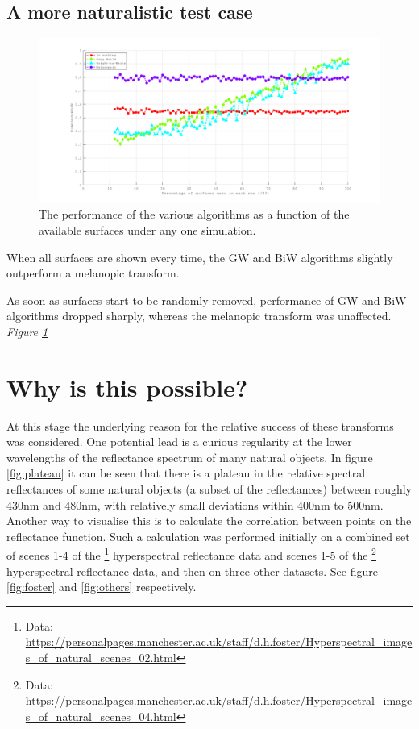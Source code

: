 
\subsection{A more naturalistic test case}

\begin{figure}[htbp]
 \includegraphics[max width=\textwidth]{figs/comp/melcomp_9/4a_summary.png}
 \caption{The performance of the various algorithms as a function of the available surfaces under any one simulation.}
 \label{fig:4asum}
\end{figure} 

When all surfaces are shown every time, the \gls{GW} and \gls{BiW} algorithms slightly outperform a melanopic transform.


As soon as surfaces start to be randomly removed, performance of \gls{GW} and \gls{BiW} algorithms dropped sharply, whereas the melanopic transform was unaffected. \emph{Figure \ref{fig:4asum}}


\section{Why is this possible?}


At this stage the underlying reason for the relative success of these transforms was considered. One potential lead is a curious regularity at the lower wavelengths of the reflectance spectrum of many natural objects. In figure \ref{fig:plateau} it can be seen that there is a plateau in the relative spectral reflectances of some natural objects (a subset of the \citet{vrhel_measurement_1994} reflectances) between roughly 430nm and 480nm, with relatively small deviations within 400nm to 500nm. Another way to visualise this is to calculate the correlation between points on the reflectance function. Such a calculation was performed initially on a combined set of scenes 1-4 of the
\citet{nascimento_statistics_2002}\footnote{Data: \url{https://personalpages.manchester.ac.uk/staff/d.h.foster/Hyperspectral_images_of_natural_scenes_02.html}} hyperspectral reflectance data and
scenes 1-5 of the 
\citet{foster_frequency_2006}\footnote{Data: \url{https://personalpages.manchester.ac.uk/staff/d.h.foster/Hyperspectral_images_of_natural_scenes_04.html}}
hyperspectral reflectance data, and then on three other datasets. See figure \ref{fig:foster} and \ref{fig:others} respectively.

